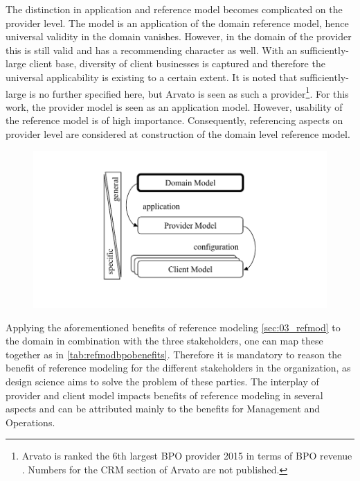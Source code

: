 The distinction in application and reference model becomes complicated on the provider level. The model is an application of the domain reference model, hence universal validity in the domain vanishes. However, in the domain of the provider this is still valid and has a recommending character as well. With an sufficiently-large client base, diversity of client businesses is captured and therefore the universal applicability is existing to a certain extent. It is noted that sufficiently-large is no further specified here, but Arvato is seen as such a provider\footnote{Arvato is ranked the 6th largest BPO provider 2015 in terms of BPO revenue \cite{hfs2016top}. Numbers for the CRM section of Arvato are not published.}. For this work, the provider model is seen as an application model. However, usability of the reference model is of high importance. Consequently, referencing aspects on provider level are considered at construction of the domain level reference model.  
  
\begin{figure}[caption={Model levels}, label={fig:modellevels}]
	{	\includegraphics[width=.8\textwidth]{figures/refmodlevels.pdf}}
\end{figure}

Applying the aforementioned benefits of reference modeling \ref{sec:03_refmod} to the domain in combination with the three stakeholders, one can map these together as in \Tab \ref{tab:refmodbpobenefits}. Therefore it is mandatory to reason the benefit of reference modeling for the different stakeholders in the organization, as design science aims to solve the problem of these parties. The interplay of provider and client model impacts benefits of reference modeling in several aspects and can be attributed mainly to the benefits for Management and Operations.


